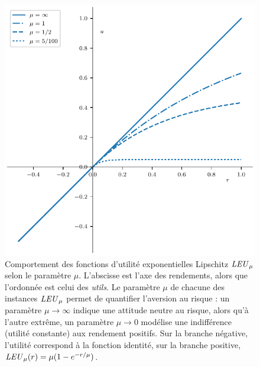 \begin{figure}[ht]
  \centering
  \includegraphics[width=\textwidth]{../experiments/fig/leus.pdf}
  \caption[Utilité Lipschitz exponentielle (LEU)]{Comportement des fonctions d'utilité
    exponentielles Lipschitz $\mbox{\textit{LEU}}_\mu$ selon le paramètre $\mu$. L'abscisse est l'axe des
    rendements, alors que l'ordonnée est celui des \textit{utils}. Le paramètre $\mu$ de
    chacune des instances $\mbox{\textit{LEU}}_\mu$ permet de quantifier l'aversion au risque : un
    paramètre $\mu\to\infty$ indique une attitude neutre au risque, alors qu'à l'autre extrême, un
    paramètre $\mu\to0$ modélise une indifférence (utilité constante) aux rendement
    positifs. Sur la branche négative, l'utilité correspond à la fonction identité, sur la
    branche positive, $\mbox{\textit{LEU}}_\mu(r) = \mu(1-e^{-r/\mu})$.}
  \label{fig_leus}
\end{figure}

